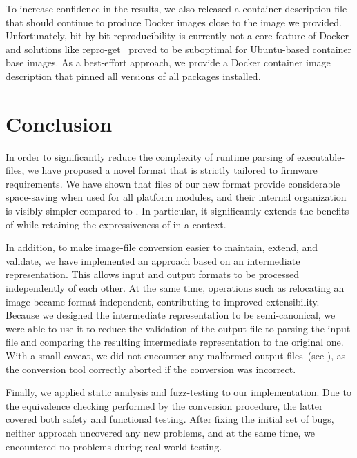 To increase confidence in the results, we also released a container description file that should continue to produce Docker images close to the image we provided. Unfortunately, bit-by-bit reproducibility is currently not a core feature of Docker and solutions like repro-get~\cite{repro-get} proved to be suboptimal for Ubuntu-based container base images. As a best-effort approach, we provide a Docker container image description that pinned all versions of all packages installed.

\chapter{Conclusion}
\label{chap:conclusion}

In order to significantly reduce the complexity of runtime parsing of  \glspl{executable-file}, we have proposed a novel format that is strictly tailored to  \gls{firmware} requirements. We have shown that files of our new format provide considerable space-saving when used for all platform modules, and their internal organization is visibly simpler compared to . In particular, it significantly extends the benefits of  while retaining the expressiveness of  in a  context.

In addition, to make \gls{image-file} conversion easier to maintain, extend, and validate, we have implemented an approach based on an intermediate representation. This allows input and output formats to be processed independently of each other. At the same time, operations such as relocating an \gls{image} became format-independent, contributing to improved extensibility. Because we designed the intermediate representation to be semi-canonical, we were able to use it to reduce the validation of the output file to parsing the input file and comparing the resulting intermediate representation to the original one. With a small caveat, we did not encounter any malformed output files~(see ), as the conversion tool correctly aborted if the conversion was incorrect.

Finally, we applied static analysis and \gls{fuzz-testing} to our implementation. Due to the equivalence checking performed by the conversion procedure, the latter covered both safety and functional testing. After fixing the initial set of bugs, neither approach uncovered any new problems, and at the same time, we encountered no problems during real-world testing.

